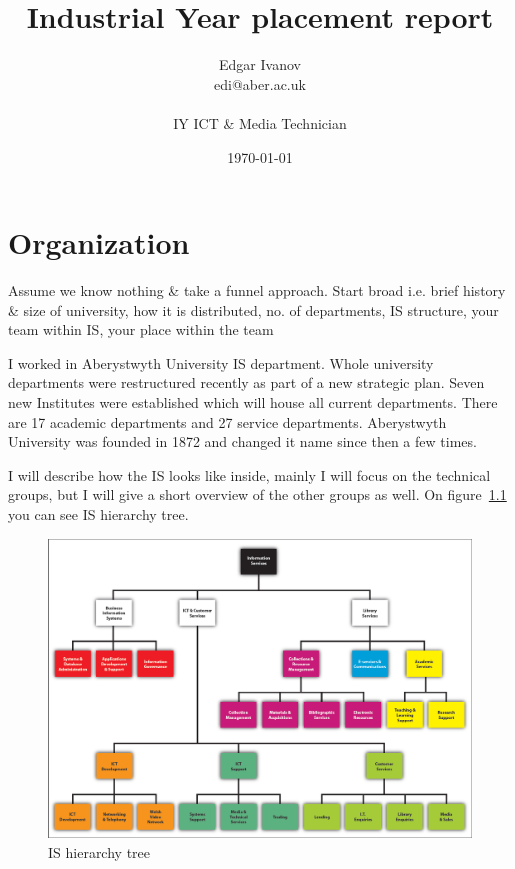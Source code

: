 \documentclass[10pt,a4paper,headinclude=true]{report}
\begin{document}
\title{Industrial Year placement report}
\author{Edgar Ivanov\\ edi@aber.ac.uk \\ \\ IY ICT \& Media Technician}
\date{\today}
\maketitle

\tableofcontents

\chapter{Organization}
Assume we know nothing \& take a funnel approach. Start broad i.e. brief history \&
size of university, how it is distributed, no. of departments, IS structure, your
team within IS, your place within the team

I worked in Aberystwyth University IS department. Whole university departments were restructured recently as part of a new strategic plan. Seven new Institutes were established which will house all current departments. There are 17 academic departments and 27 service departments. Aberystwyth University was founded in 1872 and changed it name since then a few times. 



I will describe how the IS looks like inside, mainly I will focus on the technical groups, but I will give a short overview of the other groups as well. On figure~\ref{fig:i-s-hierarchy-tree-march-2012} you can see IS hierarchy tree.

\begin{figure}[htbp]
\centering
\centerline{\includegraphics[scale=0.5]{./i-s-hierarchy-tree-march-2012}}
\caption{IS hierarchy tree}
\label{fig:i-s-hierarchy-tree-march-2012}
\end{figure}
\end{document}
